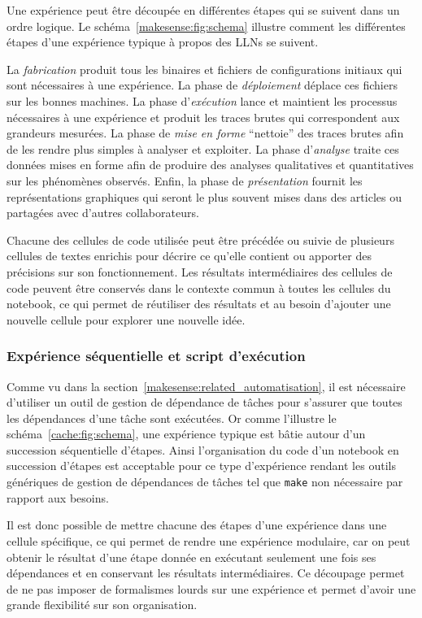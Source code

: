 Une expérience peut être découpée en différentes étapes qui se suivent dans un ordre logique.
Le schéma~\ref{makesense:fig:schema} illustre comment les différentes étapes d'une expérience typique à propos des \ac{LLN}s se suivent.

La \emph{fabrication} produit tous les binaires et fichiers de configurations initiaux qui sont nécessaires à une expérience.
La phase de \emph{déploiement} déplace ces fichiers sur les bonnes machines.
La phase d'\emph{exécution} lance et maintient les processus nécessaires à une expérience et produit les traces brutes qui correspondent aux grandeurs mesurées.
La phase de \emph{mise en forme} ``nettoie'' des traces brutes afin de les rendre plus simples à analyser et exploiter.
La phase d'\emph{analyse} traite ces données mises en forme afin de produire des analyses qualitatives et quantitatives sur les phénomènes observés.
Enfin, la phase de \emph{présentation} fournit les représentations graphiques qui seront le plus souvent mises dans des articles ou partagées avec d'autres collaborateurs.

Chacune des cellules de code utilisée peut être précédée ou suivie de plusieurs cellules de textes enrichis pour décrire ce qu'elle contient ou apporter des précisions sur son fonctionnement.
Les résultats intermédiaires des cellules de code peuvent être conservés dans le contexte commun à toutes les cellules du notebook, ce qui permet de réutiliser des résultats et au besoin d'ajouter une nouvelle cellule pour explorer une nouvelle idée.

\subsubsection{Expérience séquentielle et script d'exécution}
\label{makesense:sequentiel}

Comme vu dans la section~\ref{makesense:related_automatisation}, il est nécessaire d'utiliser un outil de gestion de dépendance de tâches pour s'assurer que toutes les dépendances d'une tâche sont exécutées.
Or comme l'illustre le schéma~\ref{cache:fig:schema}, une expérience typique est bâtie autour d'un succession séquentielle d'étapes.
Ainsi l'organisation du code d'un notebook en succession d'étapes est acceptable pour ce type d'expérience rendant les outils génériques de gestion de dépendances de tâches tel que \texttt{make} non nécessaire par rapport aux besoins.

Il est donc possible de mettre chacune des étapes d'une expérience dans une cellule spécifique, ce qui permet de rendre une expérience modulaire, car on peut obtenir le résultat d'une étape donnée en exécutant seulement une fois ses dépendances et en conservant les résultats intermédiaires.
Ce découpage permet de ne pas imposer de formalismes lourds sur une expérience et permet d'avoir une grande flexibilité sur son organisation.

